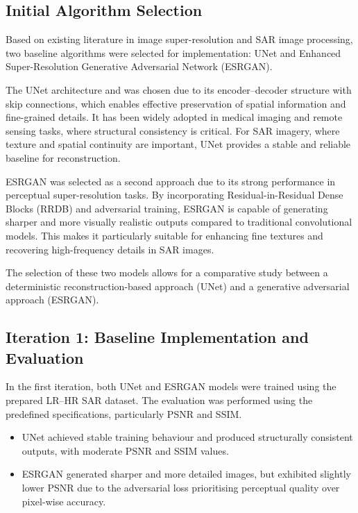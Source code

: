 \documentclass[conference]{IEEEtran}
\begin{document}
\subsection{Initial Algorithm Selection}

Based on existing literature in image super-resolution and SAR image processing, two baseline algorithms were selected for implementation: UNet and Enhanced Super-Resolution Generative Adversarial Network (ESRGAN).

The UNet architecture\cite{ye2024water} and\cite{Song2022HAUnet} was chosen due to its encoder–decoder structure with skip connections, which enables effective preservation of spatial information and fine-grained details. It has been widely adopted in medical imaging and remote sensing tasks, where structural consistency is critical. For SAR imagery, where texture and spatial continuity are important, UNet provides a stable and reliable baseline for reconstruction.

ESRGAN\cite{Toosi2026S3ESRGAN, Cao2026SuperiorSonar} was selected as a second approach due to its strong performance in perceptual super-resolution tasks. By incorporating Residual-in-Residual Dense Blocks (RRDB) and adversarial training, ESRGAN is capable of generating sharper and more visually realistic outputs compared to traditional convolutional models. This makes it particularly suitable for enhancing fine textures and recovering high-frequency details in SAR images.

The selection of these two models allows for a comparative study between a deterministic reconstruction-based approach (UNet) and a generative adversarial approach (ESRGAN).

\subsection{Iteration 1: Baseline Implementation and Evaluation}

In the first iteration, both UNet and ESRGAN models were trained using the prepared LR–HR SAR dataset. The evaluation was performed using the predefined specifications, particularly PSNR and SSIM.

\begin{itemize}
    \item UNet achieved stable training behaviour and produced structurally consistent outputs, with moderate PSNR and SSIM values.
    \item ESRGAN generated sharper and more detailed images, but exhibited slightly lower PSNR due to the adversarial loss prioritising perceptual quality over pixel-wise accuracy.
\end{itemize}
\end{document}
